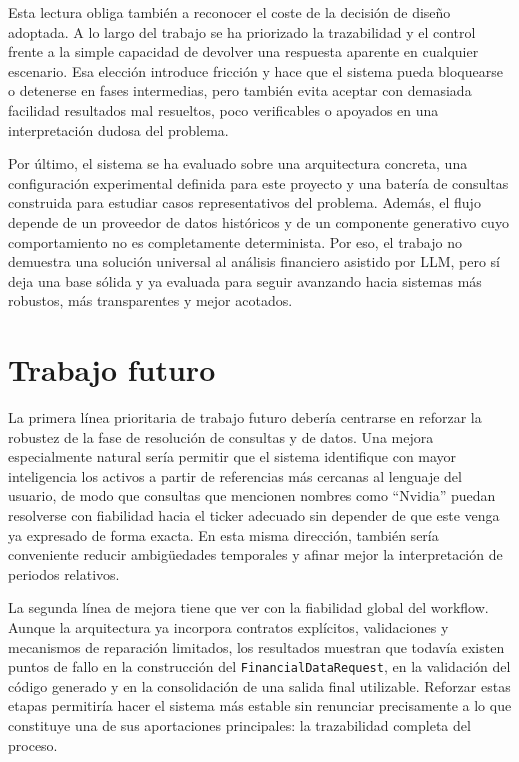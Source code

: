 Esta lectura obliga tambi\'en a reconocer el coste de la decisi\'on de dise\~no adoptada. A lo largo del trabajo se ha priorizado la trazabilidad y el control 
frente a la simple capacidad de devolver una respuesta aparente en cualquier escenario. Esa elecci\'on introduce fricci\'on y hace que el sistema pueda bloquearse 
o detenerse en fases intermedias, pero tambi\'en evita aceptar con demasiada facilidad resultados mal resueltos, poco verificables o apoyados en una interpretaci\'on 
dudosa del problema.

Por \'ultimo, el sistema se ha evaluado sobre una arquitectura concreta, una configuraci\'on experimental definida para este proyecto y una bater\'ia de consultas 
construida para estudiar casos representativos del problema. Adem\'as, el flujo depende de un proveedor de datos hist\'oricos y de un componente generativo cuyo 
comportamiento no es completamente determinista. Por eso, el trabajo no demuestra una soluci\'on universal al an\'alisis financiero asistido por LLM, pero s\'i deja 
una base s\'olida y ya evaluada para seguir avanzando hacia sistemas m\'as robustos, m\'as transparentes y mejor acotados.

\section{Trabajo futuro}

La primera l\'inea prioritaria de trabajo futuro deber\'ia centrarse en reforzar la robustez de la fase de resoluci\'on de consultas y de datos. Una mejora especialmente 
natural ser\'ia permitir que el sistema identifique con mayor inteligencia los activos a partir de referencias m\'as cercanas al lenguaje del usuario, de modo que 
consultas que mencionen nombres como ``Nvidia'' puedan resolverse con fiabilidad hacia el ticker adecuado sin depender de que este venga ya expresado de forma exacta. 
En esta misma direcci\'on, tambi\'en ser\'ia conveniente reducir ambig\"uedades temporales y afinar mejor la interpretaci\'on de periodos relativos.

La segunda l\'inea de mejora tiene que ver con la fiabilidad global del workflow. Aunque la arquitectura ya incorpora contratos expl\'icitos, validaciones y mecanismos 
de reparaci\'on limitados, los resultados muestran que todav\'ia existen puntos de fallo en la construcci\'on del \texttt{FinancialDataRequest}, en la validaci\'on del 
c\'odigo generado y en la consolidaci\'on de una salida final utilizable. Reforzar estas etapas permitir\'ia hacer el sistema m\'as estable sin renunciar precisamente 
a lo que constituye una de sus aportaciones principales: la trazabilidad completa del proceso.

